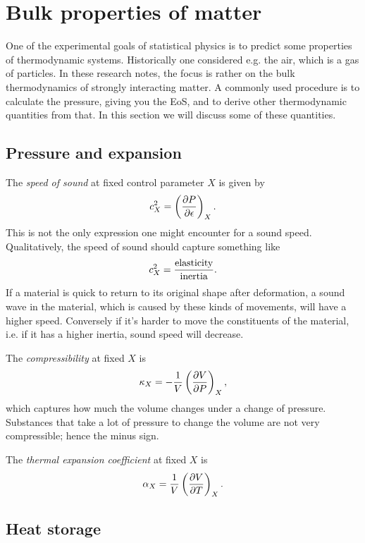 \section{Bulk properties of matter}

One of the experimental goals of statistical physics is to predict some
properties of thermodynamic systems. Historically one considered e.g.
the air, which is a gas of particles. In these research notes, the focus
is rather on the bulk thermodynamics of strongly interacting matter.
A commonly used procedure is to calculate the pressure, giving
you the EoS, and to derive other thermodynamic quantities from that.
In this section we will discuss some of these quantities.

\subsection{Pressure and expansion}
The {\it speed of sound} at fixed control parameter $X$
is given by
\begin{equation}
  c_X^2=\left(\pdv{P}{\epsilon}\right)_{X}.
\end{equation}
This is not the only expression one might encounter for a sound speed.
Qualitatively, the speed of sound should capture something like
\begin{equation}
  c_X^2=\frac{{\rm elasticity}}{{\rm inertia}}.
\end{equation}
If a material is quick to return to its original shape after deformation, a sound
wave in the material, which is caused by these kinds of movements, will have a
higher speed. Conversely if it's harder to move the constituents of the
material, i.e. if it has a higher inertia, sound speed will decrease.


The {\it compressibility} at fixed $X$ is
\begin{equation}
  \kappa_X=-\frac{1}{V}\left(\pdv{V}{P}\right)_{X},
\end{equation}
which captures how much the volume changes under a change of pressure.
Substances that take a lot of pressure to change the volume are not
very compressible; hence the minus sign.

The {\it thermal expansion coefficient}
at fixed $X$ is
\begin{equation}
  \alpha_X=\frac{1}{V}\left(\pdv{V}{T}\right)_{X}.
\end{equation}

\subsection{Heat storage}


